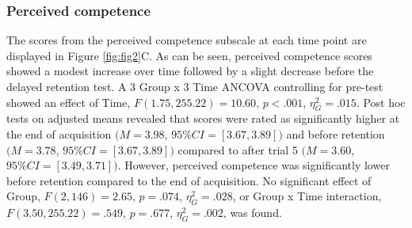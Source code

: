 \documentclass[
  english,
  man, donotrepeattitle,floatsintext]{apa7}
\begin{document}
\hypertarget{perceived-competence}{%
\subsubsection{Perceived competence}\label{perceived-competence}}

The scores from the perceived competence subscale at each time point are displayed in Figure \ref{fig:fig2}C. As can be seen, perceived competence scores showed a modest increase over time followed by a slight decrease before the delayed retention test. A 3 Group x 3 Time ANCOVA controlling for pre-test showed an effect of Time, \(F(1.75,255.22) = 10.60\), \(p < .001\), \(\eta^2_{G} = .015\). Post hoc tests on adjusted means revealed that scores were rated as significantly higher at the end of acquisition \((M = 3.98\), \(95\%CI = [3.67,3.89])\) and before retention \((M = 3.78\), \(95\%CI = [3.67,3.89])\) compared to after trial 5 \((M = 3.60\), \(95\%CI = [3.49,3.71])\). However, perceived competence was significantly lower before retention compared to the end of acquisition. No significant effect of Group, \(F(2,146) = 2.65\), \(p = .074\), \(\eta^2_{G} = .028\), or Group x Time interaction, \(F(3.50,255.22) = .549\), \(p = .677\), \(\eta^2_{G} = .002\), was found.
\end{document}
